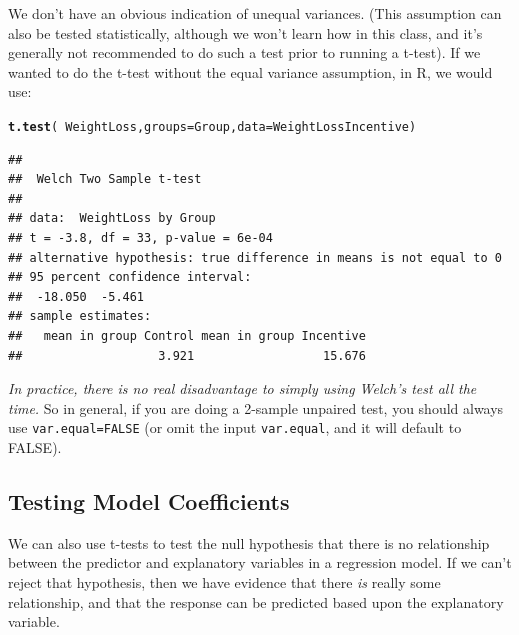 \documentclass[twoside]{book}\usepackage[]{graphicx}\usepackage[]{xcolor}
\makeatletter
\newcommand{\hlopt}[1]{\textcolor[rgb]{0,0,0}{#1}}%
\newcommand{\hlstd}[1]{\textcolor[rgb]{0.345,0.345,0.345}{#1}}%
\newcommand{\hlkwc}[1]{\textcolor[rgb]{0.333,0.667,0.333}{#1}}%
\newcommand{\hlkwd}[1]{\textcolor[rgb]{0.737,0.353,0.396}{\textbf{#1}}}%
\newenvironment{kframe}{%
 \def\at@end@of@kframe{}%
 \ifinner\ifhmode%
  \def\at@end@of@kframe{\end{minipage}}%
  \begin{minipage}{\columnwidth}%
 \fi\fi%
 \def\FrameCommand##1{\hskip\@totalleftmargin \hskip-\fboxsep
 \colorbox{shadecolor}{##1}\hskip-\fboxsep
     \hskip-\linewidth \hskip-\@totalleftmargin \hskip\columnwidth}%
 \MakeFramed {\advance\hsize-\width
   \@totalleftmargin\z@ \linewidth\hsize
   \@setminipage}}%
 {\par\unskip\endMakeFramed%
 \at@end@of@kframe}
\newenvironment{knitrout}{}{} %
\makeatother
\begin{document}
We don't have an obvious indication of unequal variances. (This assumption can also be tested statistically, although we won't learn how in this class, and it's generally not recommended to do such a test prior to running a t-test).  If we wanted to do the t-test without the equal variance assumption, in R, we would use:
\begin{knitrout}
\color{fgcolor}\begin{kframe}
\begin{alltt}
\hlkwd{t.test}\hlstd{(} \hlopt{~} \hlstd{WeightLoss,} \hlkwc{groups} \hlstd{= Group,} \hlkwc{data} \hlstd{= WeightLossIncentive)}
\end{alltt}
\begin{verbatim}
## 
## 	Welch Two Sample t-test
## 
## data:  WeightLoss by Group
## t = -3.8, df = 33, p-value = 6e-04
## alternative hypothesis: true difference in means is not equal to 0
## 95 percent confidence interval:
##  -18.050  -5.461
## sample estimates:
##   mean in group Control mean in group Incentive 
##                   3.921                  15.676
\end{verbatim}
\end{kframe}
\end{knitrout}

\emph{In practice, there is no real disadvantage to simply using Welch's test all the time.}  So in general, if you are doing a 2-sample unpaired test, you should always use \texttt{var.equal=FALSE} (or omit the input \texttt{var.equal}, and it will default to FALSE).


\subsection{Testing Model Coefficients}

We can also use t-tests to test the null hypothesis that there is no relationship between the predictor and explanatory variables in a regression model.  If we can't reject that hypothesis, then we have evidence that there \emph{is} really some relationship, and that the response can be predicted based upon the explanatory variable.
\end{document}
